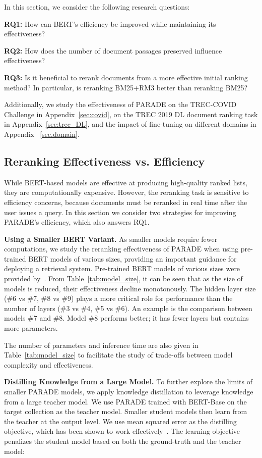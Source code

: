 \documentclass[11pt,a4paper]{article}
\newcommand{\squishlist}{
 \begin{list}{}
  { \setlength{\itemsep}{0pt}
     \setlength{\parsep}{1pt}
     \setlength{\topsep}{1pt}
     \setlength{\partopsep}{0pt}
     \setlength{\leftmargin}{1.5em}
     \setlength{\labelwidth}{1em}
     \setlength{\labelsep}{0.5em} } }
\newcommand{\squishend}{
  \end{list}  }
\newcommand{\paragraphHdTop}[1] {\noindent\textbf{#1}} \newcommand{\paragraphHd}[1] {\vspace{3pt}\noindent\textbf{#1}}
\begin{document}
In this section, we consider the following research questions:
\squishlist
    \item {\bf RQ1:} How can BERT's efficiency be improved while maintaining its effectiveness?
    \item {\bf RQ2:} How does the number of document passages preserved influence effectiveness?
    \item {\bf RQ3:} Is it beneficial to rerank documents from a more effective initial ranking method? In particular, is reranking BM25+RM3 better than reranking BM25? 
\squishend
Additionally, we study the effectiveness of PARADE on the TREC-COVID Challenge in Appendix~\ref{sec:covid}, on the TREC 2019 DL document ranking task in Appendix~\ref{sec:trec_DL}, and the impact of fine-tuning on different domains in Appendix ~\ref{sec.domain}.

\subsection{Reranking Effectiveness vs. Efficiency} \label{sec.modelsize}
While BERT-based models are effective at producing high-quality ranked lists, they are computationally expensive.
However, the reranking task is sensitive to efficiency concerns, because documents must be reranked in real time after the user issues a query.
In this section we consider two strategies for improving PARADE's efficiency, which also answers  RQ1.

\paragraphHdTop{Using a Smaller BERT Variant.}
As smaller models require fewer computations, we study the reranking effectiveness of PARADE when using pre-trained BERT models of various sizes, providing an important guidance for deploying a retrieval system. 
Pre-trained BERT models of various sizes were provided by~\citep{DBLP:journals/corr/abs-1908-08962}.
From Table~\ref{tab:model_size}, it can be seen that as the size of models is reduced, their effectiveness decline monotonously.
The hidden layer size (\#6 vs \#7, \#8 vs \#9) plays a more critical role for performance than the number of layers (\#3 vs \#4, \#5 vs \#6).
An example is the comparison between models \#7 and \#8.
Model \#8 performs better; it has fewer layers but contains more parameters.

The number of parameters and inference time are also given in Table~\ref{tab:model_size} to facilitate the study of trade-offs between model  complexity and effectiveness.

\paragraphHd{Distilling Knowledge from a Large Model.}
To further explore the limits of smaller PARADE models, we apply knowledge distillation to leverage knowledge from a large teacher model.
We use PARADE trained with BERT-Base on the target collection as the teacher model.
Smaller student models then learn from the teacher at the output level.
We use mean squared error as the distilling objective, which has been shown to work effectively~\cite{DBLP:journals/corr/abs-2004-11045,DBLP:journals/corr/abs-1903-12136}.
The learning objective penalizes the student model based on both the ground-truth and the teacher model:
\end{document}

